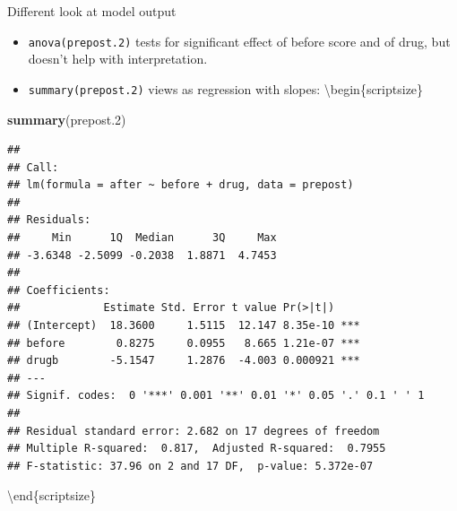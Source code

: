 \documentclass[ignorenonframetext,]{beamer}
\newenvironment{Shaded}{\begin{snugshade}}{\end{snugshade}}
\newcommand{\FloatTok}[1]{\textcolor[rgb]{0.00,0.00,0.81}{#1}}
\newcommand{\KeywordTok}[1]{\textcolor[rgb]{0.13,0.29,0.53}{\textbf{#1}}}
\newcommand{\NormalTok}[1]{#1}
\begin{document}
\begin{frame}[fragile]{Different look at model output}
\protect\hypertarget{different-look-at-model-output}{}

\begin{itemize}
\item
  \texttt{anova(prepost.2)} tests for significant effect of before score
  and of drug, but doesn't help with interpretation.
\item
  \texttt{summary(prepost.2)} views as regression with slopes:
  \textbackslash{}begin\{scriptsize\}
\end{itemize}

\begin{Shaded}
\begin{Highlighting}[]
\KeywordTok{summary}\NormalTok{(prepost}\FloatTok{.2}\NormalTok{)}
\end{Highlighting}
\end{Shaded}

\begin{verbatim}
## 
## Call:
## lm(formula = after ~ before + drug, data = prepost)
## 
## Residuals:
##     Min      1Q  Median      3Q     Max 
## -3.6348 -2.5099 -0.2038  1.8871  4.7453 
## 
## Coefficients:
##             Estimate Std. Error t value Pr(>|t|)    
## (Intercept)  18.3600     1.5115  12.147 8.35e-10 ***
## before        0.8275     0.0955   8.665 1.21e-07 ***
## drugb        -5.1547     1.2876  -4.003 0.000921 ***
## ---
## Signif. codes:  0 '***' 0.001 '**' 0.01 '*' 0.05 '.' 0.1 ' ' 1
## 
## Residual standard error: 2.682 on 17 degrees of freedom
## Multiple R-squared:  0.817,  Adjusted R-squared:  0.7955 
## F-statistic: 37.96 on 2 and 17 DF,  p-value: 5.372e-07
\end{verbatim}

\textbackslash{}end\{scriptsize\}

\end{frame}
\end{document}
